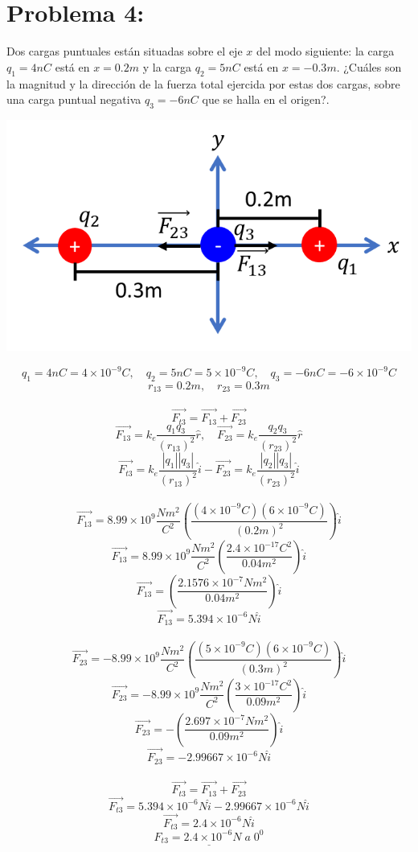 \documentclass[12pt]{article}
\begin{document}
		\section{Problema 4:}\label{sec:Problema4}
			Dos cargas puntuales están situadas sobre el eje $ x $ del modo siguiente: la carga
			$ q_1 = 4nC $ está en $ x = 0.2m $ y la carga $ q_2 = 5nC $ está en $ x = -0.3m $. ¿Cuáles son
			la magnitud y la dirección de la fuerza total ejercida por estas dos cargas, sobre una
			carga puntual negativa $ q_3 = -6nC $ que se halla en el origen?.
			\begin{center}
				\includegraphics[width=.4\linewidth]{Imp4t1.png} 
			\end{center}
			$$ q_1 = 4nC = 4 \times 10^{-9}C, \quad q_2 = 5nC = 5 \times 10^{-9}C, \quad q_3 = -6nC = -6 \times 10^{-9}C $$
			$$ r_{13} = 0.2m, \quad r_{23} = 0.3m $$ \\
			$$ \vec{F_{t3}} = \vec{F_{13}} + \vec{F_{23}} $$
			$$ \vec{F_{13}} = k_e \frac{q_1q_3}{(r_{13})^2} \hat{r}, \quad \vec{F_{23}} = k_e \frac{q_2q_3}{(r_{23})^2} \hat{r} $$
			$$ \vec{F_{t3}} = k_e \frac{|q_1||q_3|}{(r_{13})^2} \hat{i} - \vec{F_{23}} = k_e \frac{|q_2||q_3|}{(r_{23})^2} \hat{i} $$ \\
			$$ \vec{F_{13}} = 8.99 \times 10^9 \frac{Nm^2}{C^2} \left(  \frac{(4 \times 10^{-9}C)(6 \times 10^{-9}C)}{(0.2m)^2} \right) \hat{i} $$
			$$ \vec{F_{13}} = 8.99 \times 10^9 \frac{Nm^2}{C^2} \left(  \frac{2.4 \times 10^{-17}C^2}{0.04m^2} \right) \hat{i} $$
			$$ \vec{F_{13}} = \left(  \frac{2.1576 \times 10^{-7}Nm^2}{0.04m^2} \right) \hat{i} $$
			$$ \vec{F_{13}} = 5.394 \times 10^{-6}N \hat{i} $$ \\
			$$ \vec{F_{23}} = -8.99 \times 10^9 \frac{Nm^2}{C^2} \left(  \frac{(5 \times 10^{-9}C)(6 \times 10^{-9}C)}{(0.3m)^2} \right) \hat{i} $$
			$$ \vec{F_{23}} = -8.99 \times 10^9 \frac{Nm^2}{C^2} \left(  \frac{3 \times 10^{-17}C^2}{0.09m^2} \right) \hat{i} $$
			$$ \vec{F_{23}} = -\left(  \frac{2.697 \times 10^{-7}Nm^2}{0.09m^2} \right) \hat{i} $$
			$$ \vec{F_{23}} = -2.99667 \times 10^{-6}N \hat{i} $$ \\
			$$ \vec{F_{t3}} = \vec{F_{13}} + \vec{F_{23}} $$
			$$ \vec{F_{t3}} = 5.394 \times 10^{-6}N \hat{i} - 2.99667 \times 10^{-6}N \hat{i} $$
			$$ \vec{F_{t3}} = 2.4 \times 10^{-6}N \hat{i} $$
			$$ \underline{F_{t3} = 2.4 \times 10^{-6}N \; a \; 0^0} $$
\end{document}
